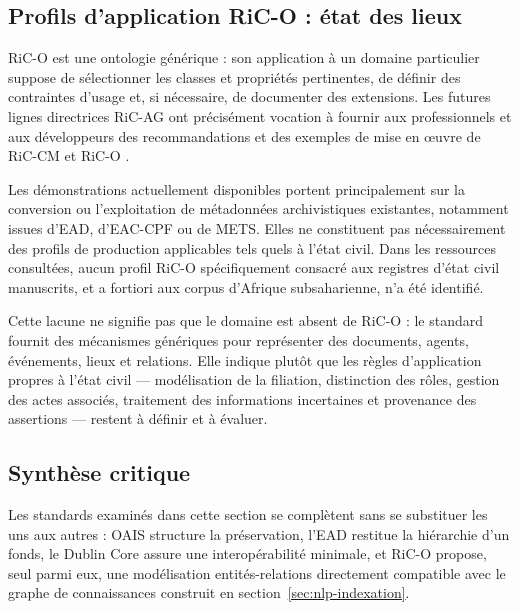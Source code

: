 \subsection{Profils d'application RiC-O : état des lieux}
\label{sec:profils-application-ric}

RiC-O est une ontologie générique : son application à un domaine particulier suppose de sélectionner les classes et propriétés pertinentes, de définir des contraintes d'usage et, si nécessaire, de documenter des extensions.
Les futures lignes directrices RiC-AG ont précisément vocation à fournir aux professionnels et aux développeurs des recommandations et des exemples de mise en œuvre de RiC-CM et RiC-O \cite{ica2023ricfad}.

Les démonstrations actuellement disponibles portent principalement sur la conversion ou l'exploitation de métadonnées archivistiques existantes, notamment issues d'EAD, d'EAC-CPF ou de METS.
Elles ne constituent pas nécessairement des profils de production applicables tels quels à l'état civil.
Dans les ressources consultées, aucun profil RiC-O spécifiquement consacré aux registres d'état civil manuscrits, et a fortiori aux corpus d'Afrique subsaharienne, n'a été identifié.

Cette lacune ne signifie pas que le domaine est absent de RiC-O : le standard fournit des mécanismes génériques pour représenter des documents, agents, événements, lieux et relations.
Elle indique plutôt que les règles d'application propres à l'état civil --- modélisation de la filiation, distinction des rôles, gestion des actes associés, traitement des informations incertaines et provenance des assertions --- restent à définir et à évaluer.

\subsection{Synthèse critique}
\label{sec:synthese-standards}

Les standards examinés dans cette section se complètent sans se substituer les uns aux autres : OAIS structure la préservation, l'EAD restitue la hiérarchie d'un fonds, le Dublin Core assure une interopérabilité minimale, et RiC-O propose, seul parmi eux, une modélisation entités-relations directement compatible avec le graphe de connaissances construit en section~\ref{sec:nlp-indexation}.

